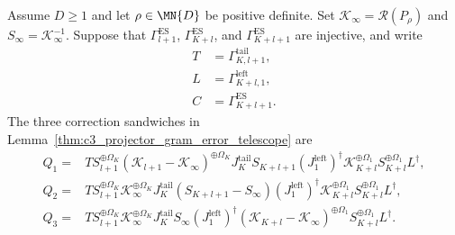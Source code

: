 \begin{definition}
    \label{def:c3_correction_sandwiches}
    \leanok
    Assume $D\geq1$ and let $\rho\in\MN{D}$ be positive definite.  Set
    $\mathcal K_\infty=\mathscr R(P_\rho)$ and
    $S_\infty=\mathcal K_\infty^{-1}$.  Suppose that
    $\Gamma_{l+1}^{\mathrm{ES}}$, $\Gamma_{K+l}^{\mathrm{ES}}$, and
    $\Gamma_{K+l+1}^{\mathrm{ES}}$ are injective, and write
    \begin{align}
        T & =\Gamma^{\mathrm{tail}}_{K,l+1}, \\
        L & =\Gamma^{\mathrm{left}}_{K+l,1}, \\
        C & =\Gamma_{K+l+1}^{\mathrm{ES}}.
    \end{align}
    The three correction sandwiches in
    Lemma~\ref{thm:c3_projector_gram_error_telescope} are
    \begin{align}
        Q_1={} & T S_{l+1}^{\oplus\Omega_K}
        (\mathcal K_{l+1}-\mathcal K_\infty)^{\oplus\Omega_K}
        J_K^{\mathrm{tail}}S_{K+l+1}(J_1^{\mathrm{left}})^\dagger
        \mathcal K_{K+l}^{\oplus\Omega_1}
        S_{K+l}^{\oplus\Omega_1}L^\dagger,  \\
        Q_2={} & T S_{l+1}^{\oplus\Omega_K}
        \mathcal K_\infty^{\oplus\Omega_K}J_K^{\mathrm{tail}}
        (S_{K+l+1}-S_\infty)(J_1^{\mathrm{left}})^\dagger
        \mathcal K_{K+l}^{\oplus\Omega_1}
        S_{K+l}^{\oplus\Omega_1}L^\dagger,  \\
        Q_3={} & T S_{l+1}^{\oplus\Omega_K}
        \mathcal K_\infty^{\oplus\Omega_K}J_K^{\mathrm{tail}}S_\infty
        (J_1^{\mathrm{left}})^\dagger
        (\mathcal K_{K+l}-\mathcal K_\infty)^{\oplus\Omega_1}
        S_{K+l}^{\oplus\Omega_1}L^\dagger.
    \end{align}
\end{definition}

